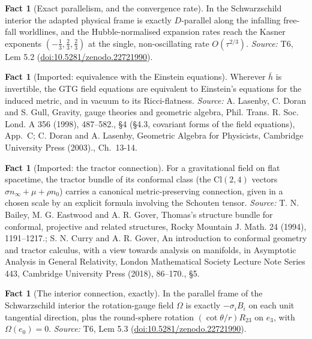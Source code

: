 \documentclass[11pt]{article}
\theoremstyle{definition}
\newtheorem{fact}[theorem]{Fact}
\theoremstyle{plain}
\providecommand{\Cl}{}\renewcommand{\Cl}{\mathrm{Cl}}
\providecommand{\hb}{}\renewcommand{\hb}{\bar{h}}
\providecommand{\nInf}{}\renewcommand{\nInf}{n_\infty}
\providecommand{\nO}{}\renewcommand{\nO}{n_0}
\begin{document}
\begin{fact}[Exact parallelism, and the convergence rate]\label{c:interior.exact-parallelism-convergence-rate}
In the Schwarzschild interior the adapted physical frame is exactly $D$-parallel along the infalling free-fall worldlines, and the Hubble-normalised expansion rates reach the Kasner exponents $(-\tfrac13, \tfrac23, \tfrac23)$ at the single, non-oscillating rate $O(\tau^{2/3})$.
\emph{Source:} T6, Lem 5.2 (\href{https://doi.org/10.5281/zenodo.22721990}{doi:10.5281/zenodo.22721990}).
\end{fact}

\begin{fact}[Imported: equivalence with the Einstein equations]\label{c:interior.imported-equivalence-einstein-equations}
Wherever $\hb$ is invertible, the GTG field equations are equivalent to Einstein's equations for the induced metric, and in vacuum to its Ricci-flatness.
\emph{Source:} A. Lasenby, C. Doran and S. Gull, Gravity, gauge theories and geometric algebra, Phil. Trans. R. Soc. Lond. A 356 (1998), 487--582., \S 4 (\S 4.3, covariant forms of the field equations), App.~C; C. Doran and A. Lasenby, Geometric Algebra for Physicists, Cambridge University Press (2003)., Ch.~13-14.
\end{fact}

\begin{fact}[Imported: the tractor connection]\label{c:interior.imported-tractor-connection}
For a gravitational field on flat spacetime, the tractor bundle of its conformal class (the $\Cl(2,4)$ vectors $\sigma\nInf + \mu + \rho\nO$) carries a canonical metric-preserving connection, given in a chosen scale by an explicit formula involving the Schouten tensor.
\emph{Source:} T. N. Bailey, M. G. Eastwood and A. R. Gover, Thomas's structure bundle for conformal, projective and related structures, Rocky Mountain J. Math. 24 (1994), 1191--1217.; S. N. Curry and A. R. Gover, An introduction to conformal geometry and tractor calculus, with a view towards analysis on manifolds, in Asymptotic Analysis in General Relativity, London Mathematical Society Lecture Note Series 443, Cambridge University Press (2018), 86--170., \S 5.
\end{fact}

\begin{fact}[The interior connection, exactly]\label{c:interior.interior-connection-exactly}
In the parallel frame of the Schwarzschild interior the rotation-gauge field $\Omega$ is exactly $-\sigma_i B_i$ on each unit tangential direction, plus the round-sphere rotation $(\cot\theta/r)R_{23}$ on $e_3$, with $\Omega(e_0) = 0$.
\emph{Source:} T6, Lem 5.3 (\href{https://doi.org/10.5281/zenodo.22721990}{doi:10.5281/zenodo.22721990}).
\end{fact}
\end{document}
